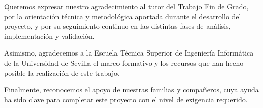 
Queremos expresar nuestro agradecimiento al tutor del Trabajo Fin de Grado,
por la orientaci\'on t\'ecnica y metodol\'ogica aportada durante el desarrollo del proyecto,
y por su seguimiento continuo en las distintas fases de an\'alisis,
implementaci\'on y validaci\'on.

Asimismo, agradecemos a la Escuela T\'ecnica Superior de Ingenier\'ia Inform\'atica
de la Universidad de Sevilla el marco formativo y los recursos
que han hecho posible la realizaci\'on de este trabajo.

Finalmente, reconocemos el apoyo de nuestras familias y compa\~neros,
cuya ayuda ha sido clave para completar este proyecto con el nivel de exigencia requerido.